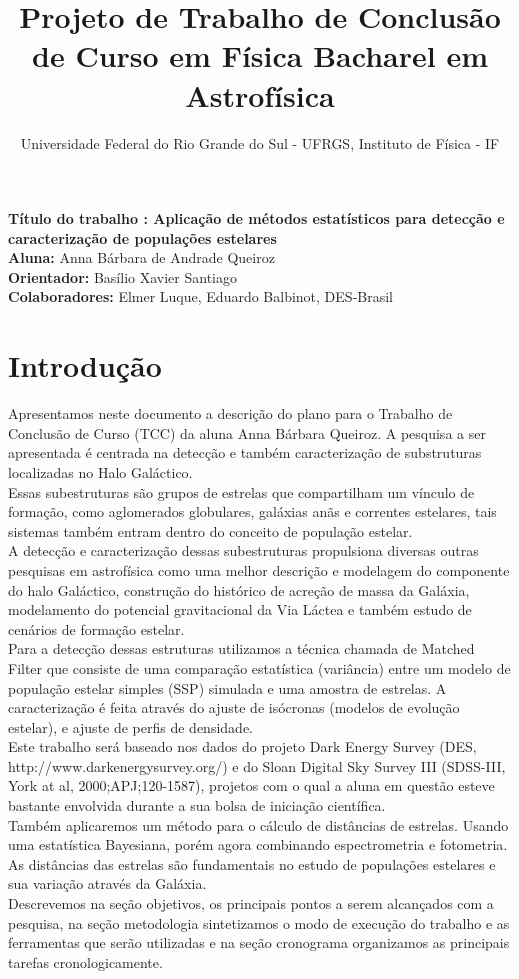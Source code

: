 \documentclass{article}
\title{Projeto de Trabalho de Conclusão de Curso em Física Bacharel em Astrofísica}
\author{Universidade Federal do Rio Grande do Sul - UFRGS, Instituto de Física - IF}
\begin{document}
\date{}
\maketitle
\begin{center}
\textbf{ Título do trabalho : Aplicação de métodos estatísticos para detecção e caracterização de populações estelares} \\
\textbf{Aluna:} Anna Bárbara de Andrade Queiroz \\
\textbf{Orientador:} Basílio Xavier Santiago \\
\textbf{Colaboradores:} Elmer Luque, Eduardo Balbinot, DES-Brasil
\end{center}

\section{Introdução}

Apresentamos neste documento a descrição do plano para o Trabalho de Conclusão de Curso (TCC) da aluna  Anna Bárbara Queiroz. A pesquisa a ser apresentada é centrada na detecção e também caracterização de substruturas localizadas no Halo Galáctico. \\
Essas subestruturas são grupos de estrelas que compartilham um vínculo de formação, como aglomerados globulares, galáxias anãs e correntes estelares, tais sistemas também entram dentro do conceito de população estelar. \\
 A detecção e caracterização dessas subestruturas propulsiona diversas outras pesquisas em astrofísica como uma melhor descrição e modelagem do componente do halo Galáctico, construção do histórico de acreção de massa da Galáxia, modelamento do potencial gravitacional da Via Láctea e também estudo de cenários de formação estelar. \\
Para a detecção dessas estruturas utilizamos a técnica chamada de Matched Filter que consiste de uma comparação estatística (variância) entre um modelo de população estelar simples (SSP) simulada e uma amostra de estrelas. A caracterização é feita através do ajuste de isócronas (modelos de evolução estelar),  e ajuste de perfis de densidade. \\
Este trabalho será baseado nos dados do projeto Dark Energy Survey
(DES, http://www.darkenergysurvey.org/) e do Sloan Digital Sky Survey III (SDSS-III, York at al, 2000;APJ;120-1587), projetos com o qual a aluna em questão esteve bastante envolvida durante a sua bolsa de iniciação científica. \\
Também aplicaremos um método para o cálculo de distâncias de estrelas. Usando uma estatística Bayesiana, porém agora combinando espectrometria e fotometria. As distâncias das estrelas são fundamentais no estudo de populações estelares e sua variação através da Galáxia. \\
Descrevemos na seção objetivos, os principais pontos a serem alcançados com a pesquisa, na seção metodologia sintetizamos o modo de execução do trabalho e as ferramentas que serão utilizadas e na seção cronograma organizamos as principais tarefas cronologicamente.
\end{document}
